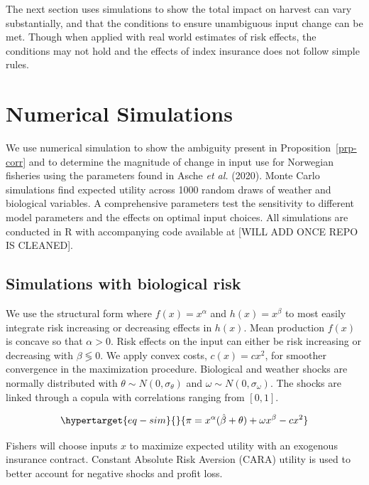 \documentclass[
  letterpaper,
  DIV=11,
  numbers=noendperiod]{scrartcl}
\theoremstyle{plain}
\theoremstyle{plain}
\theoremstyle{remark}
\begin{document}
The next section uses simulations to show the total impact on harvest
can vary substantially, and that the conditions to ensure unambiguous
input change can be met. Though when applied with real world estimates
of risk effects, the conditions may not hold and the effects of index
insurance does not follow simple rules.

\hypertarget{sec-sim}{%
\section{Numerical Simulations}\label{sec-sim}}

We use numerical simulation to show the ambiguity present in
Proposition~\ref{prp-corr} and to determine the magnitude of change in
input use for Norwegian fisheries using the parameters found in Asche
\emph{et al.} (2020). Monte Carlo simulations find expected utility
across 1000 random draws of weather and biological variables. A
comprehensive parameters test the sensitivity to different model
parameters and the effects on optimal input choices. All simulations are
conducted in R with accompanying code available at {[}WILL ADD ONCE REPO
IS CLEANED{]}.

\hypertarget{simulations-with-biological-risk}{%
\subsection{Simulations with biological
risk}\label{simulations-with-biological-risk}}

We use the structural form where \(f(x)=x^\alpha\) and \(h(x)=x^\beta\)
to most easily integrate risk increasing or decreasing effects in
\(h(x)\). Mean production \(f(x)\) is concave so that \(\alpha>0\). Risk
effects on the input can either be risk increasing or decreasing with
\(\beta\lessgtr0\). We apply convex costs, \(c(x)=cx^2\), for smoother
convergence in the maximization procedure. Biological and weather shocks
are normally distributed with \(\theta\sim N(0,\sigma_{\theta})\) and
\(\omega\sim N(0,\sigma_{\omega})\). The shocks are linked through a
copula with correlations ranging from \([0,1]\).

\begin{equation}\protect\hypertarget{eq-sim}{}{
\pi=x^\alpha(\hat\beta+\theta)+\omega x^\beta-cx^2
}\label{eq-sim}\end{equation}

Fishers will choose inputs \(x\) to maximize expected utility with an
exogenous insurance contract. Constant Absolute Risk Aversion (CARA)
utility is used to better account for negative shocks and profit loss.
\end{document}
